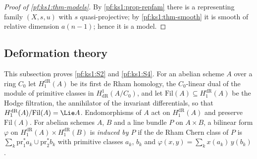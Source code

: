 \begin{proof}[Proof of \cref{pf:ks1:thm-models}]
By \cref{pf:ks1:prop-repfam} there is a representing family $(X,s,u)$ with $s$ quasi-projective; by
\cref{pf:ks1:thm-smooth} it is smooth of relative dimension $a(n-1)$; hence it is a model.
\end{proof}

\subsection{Deformation theory}\label{pf:ks1:sec-deform}

This subsection proves \ref{pf:ks1:S2} and \ref{pf:ks1:S4}. For an abelian scheme $A$ over a ring $C_0$ let $H^{\mathrm{dR}}_1(A)$ be its first de
Rham homology, the $C_0$-linear dual of the module of primitive classes in $H^1_{\mathrm{dR}}(A/C_0)$, and let $\mathrm{Fil}(A)\subseteq
H^{\mathrm{dR}}_1(A)$ be the Hodge filtration, the annihilator of the invariant differentials, so that $H^{\mathrm{dR}}_1(A)/\mathrm{Fil}(A)=\Lie A$.
Endomorphisms of $A$ act on $H^{\mathrm{dR}}_1(A)$ and preserve $\mathrm{Fil}(A)$. For abelian schemes $A$, $B$ and a line bundle $P$ on $A\times B$,
a bilinear form $\varphi$ on $H^{\mathrm{dR}}_1(A)\times H^{\mathrm{dR}}_1(B)$ is \emph{induced by $P$} if the de Rham Chern class of $P$ is
$\sum_k\mathrm{pr}_1^*a_k\cup\mathrm{pr}_2^*b_k$ with primitive classes $a_k$, $b_k$ and $\varphi(x,y)=\sum_kx(a_k)\,y(b_k)$.

